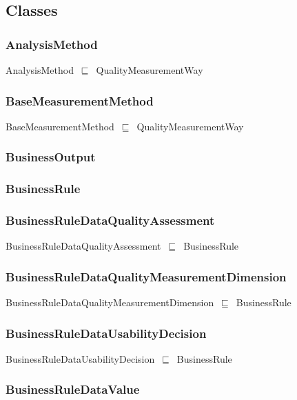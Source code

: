 \documentclass{article}
\begin{document}
\subsection*{Classes}

\subsubsection*{AnalysisMethod}

AnalysisMethod~\ensuremath{\sqsubseteq}~QualityMeasurementWay~

\subsubsection*{BaseMeasurementMethod}

BaseMeasurementMethod~\ensuremath{\sqsubseteq}~QualityMeasurementWay~

\subsubsection*{BusinessOutput}

\subsubsection*{BusinessRule}

\subsubsection*{BusinessRuleDataQualityAssessment}

BusinessRuleDataQualityAssessment~\ensuremath{\sqsubseteq}~BusinessRule~

\subsubsection*{BusinessRuleDataQualityMeasurementDimension}

BusinessRuleDataQualityMeasurementDimension~\ensuremath{\sqsubseteq}~BusinessRule~

\subsubsection*{BusinessRuleDataUsabilityDecision}

BusinessRuleDataUsabilityDecision~\ensuremath{\sqsubseteq}~BusinessRule~

\subsubsection*{BusinessRuleDataValue}
\end{document}
